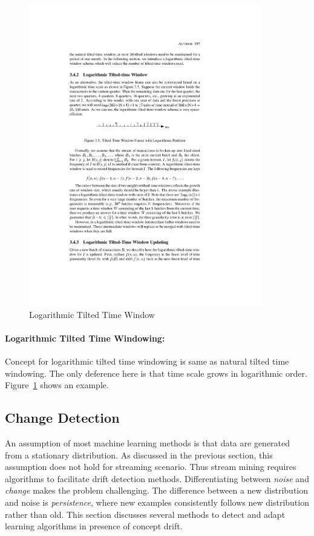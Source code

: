 \begin{figure}[htbp]
    \begin{center}
        \includegraphics[width=4.0in]{figs/logtime.pdf}
        \caption{Logarithmic Tilted Time Window}
        \label{fig:bg:ltime}
    \end{center}
\end{figure}
\paragraph{Logarithmic Tilted Time Windowing:} Concept for logarithmic tilted time windowing is same as natural tilted time windowing. The only deference here is that time scale grows in logarithmic order. Figure~\ref{fig:bg:ltime} shows an example. 


\subsection{Change Detection}
\label{sec:bg:changedetection}
An assumption of most machine learning methods is that data are generated from a stationary distribution. As discussed in the previous section, this assumption does not hold for streaming scenario. Thus stream mining requires algorithms to facilitate drift detection methods. Differentiating between {\it noise} and {\it change} makes the problem challenging. The difference between a new distribution and noise is {\it persistence}, where new examples consistently follows new distribution rather than old. This section discusses several methods to detect and adapt learning algorithms in presence of concept drift.

